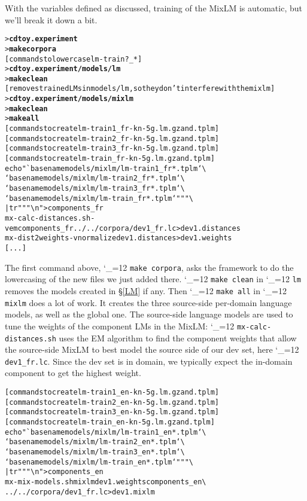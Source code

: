 \documentclass[11pt,letterpaper]{article}
\newcommand{\bs}{\textbackslash{}}
\def\code{\begingroup\catcode`\_=12 \codex}
\newcommand{\codex}[1]{\texttt{#1}\endgroup}
\begin{document}
With the variables defined as discussed, training of the MixLM is automatic,
but we'll break it down a bit.
\begin{small}
\begin{alltt}
   > \textbf{cd toy.experiment}
   > \textbf{make corpora}
   [commands to lowercase lm-train?_*]
   > \textbf{cd toy.experiment/models/lm}
   > \textbf{make clean}
   [removes trained LMs in models/lm, so they don't interfere with the mixlm]
   > \textbf{cd toy.experiment/models/mixlm}
   > \textbf{make clean}
   > \textbf{make all}
   [commands to create lm-train1_fr-kn-5g.lm.gz and .tplm]
   [commands to create lm-train2_fr-kn-5g.lm.gz and .tplm]
   [commands to create lm-train3_fr-kn-5g.lm.gz and .tplm]
   [commands to create lm-train_fr-kn-5g.lm.gz and .tplm]
   echo "`basename models/mixlm/lm-train1_fr*.tplm` \bs
         `basename models/mixlm/lm-train2_fr*.tplm` \bs
         `basename models/mixlm/lm-train3_fr*.tplm` \bs
         `basename models/mixlm/lm-train_fr*.tplm`" "" \bs
      | tr " " "\bs{}n" > components_fr
   mx-calc-distances.sh -v em components_fr ../../corpora/dev1_fr.lc > dev1.distances
   mx-dist2weights -v normalize dev1.distances > dev1.weights
   [...]
\end{alltt}
\end{small}

The first command above, \code{make corpora}, asks the framework to do the
lowercasing of the new files we just added there.  \code{make clean} in
\code{lm} removes the models created in \S\ref{LM} if any. Then \code{make all}
in \code{mixlm} does a
lot of work.  It creates the three source-side per-domain language models, as
well as the global one.  The source-side language models are used to tune the
weights of the component LMs in the MixLM: \code{mx-calc-distances.sh} uses the
EM algorithm to find the component weights that allow the source-side MixLM to
best model the source side of our dev set, here \code{dev1_fr.lc}.  Since the
dev set is in domain, we typically expect the in-domain component to get the
highest weight.

\begin{small}
\begin{alltt}
   [commands to create lm-train1_en-kn-5g.lm.gz and .tplm]
   [commands to create lm-train2_en-kn-5g.lm.gz and .tplm]
   [commands to create lm-train3_en-kn-5g.lm.gz and .tplm]
   [commands to create lm-train_en-kn-5g.lm.gz and .tplm]
   echo "`basename models/mixlm/lm-train1_en*.tplm` \bs
         `basename models/mixlm/lm-train2_en*.tplm` \bs
         `basename models/mixlm/lm-train3_en*.tplm` \bs
         `basename models/mixlm/lm-train_en*.tplm`" "" \bs
      | tr " " "\bs{}n" > components_en
   mx-mix-models.sh mixlm dev1.weights components_en \bs
      ../../corpora/dev1_fr.lc > dev1.mixlm
\end{alltt}
\end{small}
\end{document}
